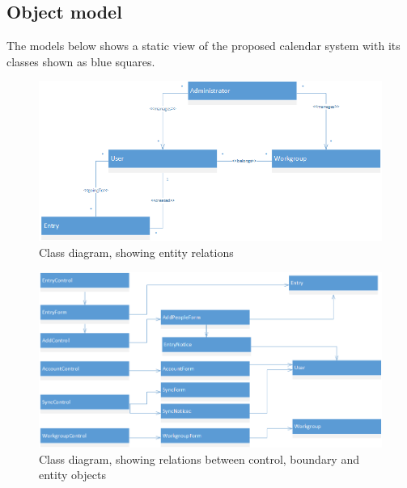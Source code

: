 \subsection{Object model}
The models below shows a static view of the proposed calendar system with its classes shown as blue squares.
\begin{figure}[h]
\centering
\includegraphics[scale = 0.6]{class21}
\caption{Class diagram, showing entity relations}
\end{figure}
\begin{figure}[h]
\centering
\includegraphics[scale = 0.5]{class22}
\pagebreak
\caption{Class diagram, showing relations between control, boundary and entity objects}
\end{figure}
\pagebreak
